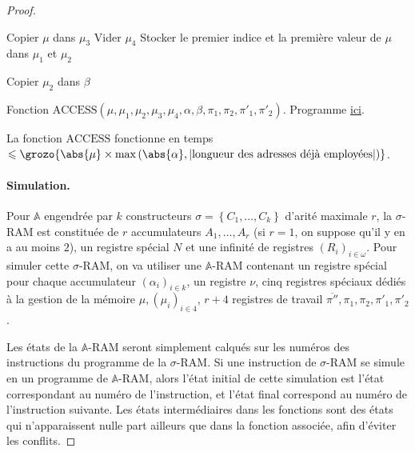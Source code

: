 \documentclass{report}
\newcommand{\bbA}{\mathbb{A}}
\begin{document}
\begin{proof}
\begin{algorithm}[H]
						\espace
						
						
						Copier $\mu$ dans $\mu_3$ \;
						Vider $\mu_4$ \;
						Stocker le premier indice et la première valeur de $\mu$ dans $\mu_1$ et $\mu_2$ \;
						
						\espace
						
						
						
						
						Copier $\mu_2$ dans $\beta$ \;
						
						\caption{Fonction $\text{ACCESS}\left( \mu, \mu_1, \mu_2, \mu_3, \mu_4, \alpha, \beta, \pi_1, \pi_2, \pi'_1, \pi'_2\right)$. Programme \hyperref[prog:A_RAM_fn_ACCESS]{ici}. }
					\end{algorithm}
					
					\espace

					La fonction $\text{ACCESS}$ fonctionne en temps $\leqslant \grozo{\abs{\mu} \times \max\left( \abs{\alpha} , \left| \text{longueur des adresses déjà employées} \right| \right) }$.
					
					\paragraph{Simulation.}
					\label{par:sim_sigma_RAM_A_RAM}
					Pour $\bbA$ engendrée par $k$ constructeurs $\sigma = \left\lbrace C_1, \dots, C_k\right\rbrace$ d'arité maximale $r$, la $\sigma$-RAM est constituée de $r$ accumulateurs $A_1, \dots, A_r$ (si $r = 1$, on suppose qu'il y en a au moins $2$), un registre spécial $N$ et une infinité de registres $(R_i)_{i \in \omega}$. Pour simuler cette $\sigma$-RAM, on va utiliser une $\bbA$-RAM contenant un registre spécial pour chaque accumulateur $(\alpha_i)_{i \in k}$, un registre $\nu$, cinq registres spéciaux dédiés à la gestion de la mémoire $\mu, (\mu_i)_{i \in 4}$, $r+4$ registres de travail $\overline{\pi''}, \pi_1, \pi_2, \pi'_1, \pi'_2$.
					
					Les états de la $\bbA$-RAM seront simplement calqués sur les numéros des instructions du programme de la $\sigma$-RAM. Si une instruction de $\sigma$-RAM se simule en un programme de $\bbA$-RAM, alors l'état initial de cette simulation est l'état correspondant au numéro de l'instruction, et l'état final correspond au numéro de l'instruction suivante. Les états intermédiaires dans les fonctions sont des états qui n'apparaissent nulle part ailleurs que dans la fonction associée, afin d'éviter les conflits. 
						

\end{proof}
\end{document}
